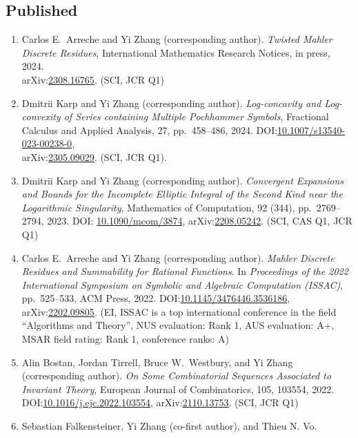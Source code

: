 \documentclass[a4paper,12pt]{article}
\begin{document}
\subsection*{Published}
\begin{enumerate}
\item  Carlos E.\ Arreche and Yi Zhang (corresponding author). {\em Twisted Mahler Discrete Residues}, International Mathematics Research Notices, in press, 2024. \\
arXiv:\href{https://arxiv.org/abs/2308.16765}{2308.16765}. (SCI, JCR Q1)
\item Dmitrii Karp and Yi Zhang (corresponding author). {\em Log-concavity and Log-convexity of Series containing Multiple Pochhammer Symbols},  Fractional Calculus and Applied Analysis, 27, pp.\ 458--486, 2024. DOI:\href{https://doi.org/10.1007/s13540-023-00238-0}{10.1007/s13540-023-00238-0}, \\ arXiv:\href{https://arxiv.org/abs/2305.09029}{2305.09029}.  (SCI, JCR Q1). 
\item Dmitrii Karp and Yi Zhang (corresponding author). {\em Convergent Expansions and Bounds for the Incomplete Elliptic Integral of the Second Kind near the Logarithmic Singularity},  Mathematics of Computation, 92 (344), pp.\ 2769--2794, 2023. DOI: \href{https://doi.org/10.1090/mcom/3874}{10.1090/mcom/3874}, arXiv:\href{https://arxiv.org/abs/2208.05242}{2208.05242}. (SCI, CAS Q1, JCR Q1)
\item Carlos E.\ Arreche and Yi Zhang (corresponding author). 
{\em Mahler Discrete Residues and Summability for Rational Functions}. In {\em Proceedings of the 2022 International Symposium on Symbolic and Algebraic Computation (ISSAC)}, 
pp.\ 525–533, ACM Press, 2022. DOI:\href{https://dl.acm.org/doi/10.1145/3476446.3536186}{10.1145/3476446.3536186},
arXiv:\href{https://arxiv.org/abs/2202.09805}{2202.09805}.  (EI, ISSAC is a top international conference in the field ``Algorithms and Theory'', NUS evaluation: Rank 1, AUS evaluation: A+, MSAR field rating: Rank 1, conference ranks: A) 
\item Alin Bostan, Jordan Tirrell, Bruce W.\ Westbury, and Yi Zhang (corresponding author). 
{\em On Some Combinatorial Sequences Associated to Invariant Theory}, European Journal of Combinatorics, 105, 103554, 2022. 
DOI:\href{https://doi.org/10.1016/j.ejc.2022.103554}{10.1016/j.ejc.2022.103554}, 
 arXiv:\href{https://arxiv.org/abs/2110.13753}{2110.13753}.  (SCI, JCR Q1)
\item Sebastian Falkensteiner, Yi Zhang (co-first author), and Thieu N. Vo. 

\end{enumerate}
\end{document}
